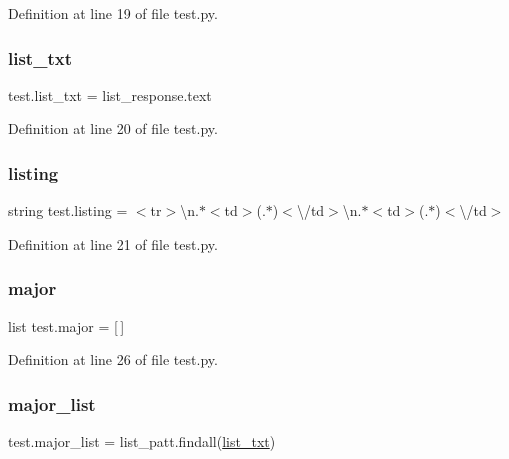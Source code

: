 Definition at line 19 of file test.\+py.

\mbox{\label{namespacetest_a8a1b8f17c829fb2fd08d4a41ad9cf087}} 
\subsubsection{\texorpdfstring{list\+\_\+txt}{list\_txt}}
{\footnotesize\ttfamily test.\+list\+\_\+txt = list\+\_\+response.\+text}



Definition at line 20 of file test.\+py.

\mbox{\label{namespacetest_aa935a14b351dde1a77f8a9fdf62ab9e4}} 
\subsubsection{\texorpdfstring{listing}{listing}}
{\footnotesize\ttfamily string test.\+listing = \textquotesingle{}$<$tr$>$\textbackslash{}n.$\ast$$<$td$>$(.$\ast$)$<$\textbackslash{}/td$>$\textbackslash{}n.$\ast$$<$td$>$(.$\ast$)$<$\textbackslash{}/td$>$\textquotesingle{}}



Definition at line 21 of file test.\+py.

\mbox{\label{namespacetest_ada45734818465c5ed866e7491e46ee3d}} 
\subsubsection{\texorpdfstring{major}{major}}
{\footnotesize\ttfamily list test.\+major = \mbox{[}$\,$\mbox{]}}



Definition at line 26 of file test.\+py.

\mbox{\label{namespacetest_a65c8db757e1e3c99b5f55ed6dcf17181}} 
\subsubsection{\texorpdfstring{major\+\_\+list}{major\_list}}
{\footnotesize\ttfamily test.\+major\+\_\+list = list\+\_\+patt.\+findall(\mbox{\hyperlink{namespacetest_a8a1b8f17c829fb2fd08d4a41ad9cf087}{list\+\_\+txt}})}



